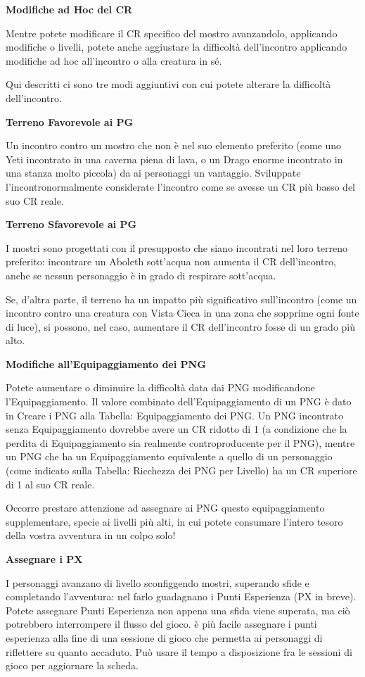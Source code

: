 \documentclass[a4paper,11pt,twoside,openany]{book}
\begin{document}
{\textbf{Modifiche ad Hoc del CR}

Mentre potete modificare il CR specifico del mostro avanzandolo, applicando modifiche o livelli, potete anche aggiustare la difficoltà dell'incontro applicando modifiche ad hoc all'incontro o alla creatura in sé. 

Qui descritti ci sono tre modi aggiuntivi con cui potete alterare la difficoltà dell'incontro.

\textbf{Terreno Favorevole ai PG}

Un incontro contro un mostro che non è nel suo elemento preferito (come uno Yeti incontrato in una caverna piena di lava, o un Drago enorme incontrato in una stanza molto piccola) da ai personaggi un vantaggio. Sviluppate l'incontronormalmente considerate l'incontro come se avesse un CR più basso del suo CR reale.

\textbf{Terreno Sfavorevole ai PG}

I mostri sono progettati con il presupposto che siano incontrati nel loro terreno preferito: incontrare un Aboleth sott’acqua non aumenta il CR dell'incontro, anche se nessun personaggio è in grado di respirare sott'acqua. 

Se, d’altra parte, il terreno ha un impatto più significativo sull'incontro (come un incontro contro una creatura con Vista Cieca in una zona che sopprime ogni fonte di luce), si possono, nel caso, aumentare il CR dell'incontro fosse di un grado più alto.


\textbf{Modifiche all'Equipaggiamento dei PNG}

Potete aumentare o diminuire la difficoltà data dai PNG modificandone l'Equipaggiamento. Il valore combinato dell'Equipaggiamento di un PNG è dato in Creare i PNG alla Tabella: Equipaggiamento dei PNG. Un PNG incontrato senza Equipaggiamento dovrebbe avere un CR ridotto di 1 (a condizione che la perdita di Equipaggiamento sia realmente controproducente per il PNG), mentre un PNG che ha un Equipaggiamento equivalente a quello di un personaggio (come indicato sulla Tabella: Ricchezza dei PNG per Livello) ha un CR superiore di 1 al suo CR reale.

Occorre prestare attenzione ad assegnare ai PNG questo equipaggiamento supplementare, specie ai livelli più alti, in cui potete consumare l'intero tesoro della vostra avventura in un colpo solo!

\textbf{Assegnare i PX}

I personaggi avanzano di livello sconfiggendo mostri, superando sfide e completando l'avventura: nel farlo guadagnano i Punti Esperienza (PX in breve). Potete assegnare Punti Esperienza non appena una sfida viene superata, ma ciò potrebbero interrompere il flusso del gioco. è più facile assegnare i punti esperienza alla fine di una sessione di gioco che permetta ai personaggi di riflettere su quanto accaduto. Può usare il tempo a disposizione fra le sessioni di gioco per aggiornare la scheda.

}
\end{document}
